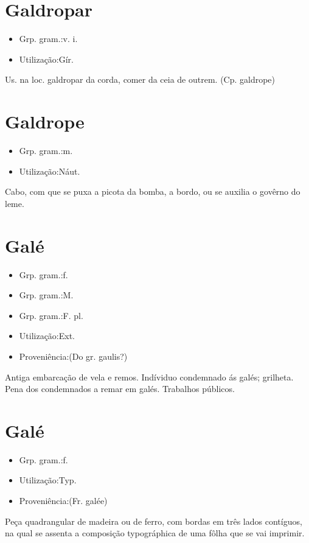 \section{Galdropar}
\begin{itemize}
\item {Grp. gram.:v. i.}
\end{itemize}
\begin{itemize}
\item {Utilização:Gír.}
\end{itemize}
Us. na loc. \textunderscore galdropar da corda\textunderscore , comer da ceia de outrem.
(Cp. \textunderscore galdrope\textunderscore )
\section{Galdrope}
\begin{itemize}
\item {Grp. gram.:m.}
\end{itemize}
\begin{itemize}
\item {Utilização:Náut.}
\end{itemize}
Cabo, com que se puxa a picota da bomba, a bordo, ou se auxilia o govêrno do leme.
\section{Galé}
\begin{itemize}
\item {Grp. gram.:f.}
\end{itemize}
\begin{itemize}
\item {Grp. gram.:M.}
\end{itemize}
\begin{itemize}
\item {Grp. gram.:F. pl.}
\end{itemize}
\begin{itemize}
\item {Utilização:Ext.}
\end{itemize}
\begin{itemize}
\item {Proveniência:(Do gr. \textunderscore gaulis\textunderscore ?)}
\end{itemize}
Antiga embarcação de vela e remos.
Indíviduo condemnado ás galés; grilheta.
Pena dos condemnados a remar em galés.
Trabalhos públicos.
\section{Galé}
\begin{itemize}
\item {Grp. gram.:f.}
\end{itemize}
\begin{itemize}
\item {Utilização:Typ.}
\end{itemize}
\begin{itemize}
\item {Proveniência:(Fr. \textunderscore galée\textunderscore )}
\end{itemize}
Peça quadrangular de madeira ou de ferro, com bordas em três lados contíguos, na qual se assenta a composição typográphica de uma fôlha que se vai imprimir.
